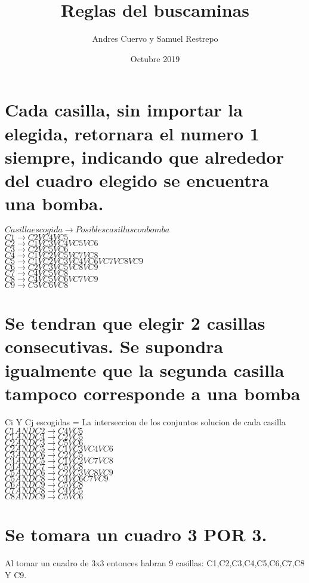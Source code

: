 \documentclass[10pt,letterpaper]{article}
\author{Andres Cuervo y Samuel Restrepo}
\title{Reglas del buscaminas}
\date{Octubre 2019}
\begin{document}
\maketitle

\section{Cada casilla, sin importar la elegida, retornara el numero 1 siempre, indicando que alrededor del cuadro elegido se encuentra una bomba.
}
$Casilla escogida \rightarrow   {Posibles casillas con bomba}$\\
$C1 \rightarrow{C2 V C4 V C5}$ \\
$C2 \rightarrow{C1 V C3 V C4 V C5 V C6}$\\
$C3 \rightarrow {C2 V C5 V C6}$\\
$C4 \rightarrow {C1 V C2 V C5 V C7 V C8}$\\
$C5 \rightarrow {C1 V C2 V C3 V C4 V C6 V C7 V C8 V C9}$\\
$C6 \rightarrow {C2 V C3 V C5 V C8 V C9}$ \\
$C7 \rightarrow {C4 V C5 V C8}$\\
$C8 \rightarrow {C4 V C5 V C6 V C7 V C9}$\\
$C9 \rightarrow {C5 V C6 V C8}$\\
\section{Se tendran que elegir 2 casillas consecutivas. Se supondra igualmente que la
segunda casilla tampoco corresponde a una bomba}
Ci Y Cj escogidas = La interseccion de los conjuntos solucion de cada casilla\\
$C1 AND C2 \rightarrow {C4 V C5}$\\
$C1 AND C4 \rightarrow {C2 V C5}$\\
$C2 AND C3 \rightarrow {C5 V C6}$\\
$C2 AND C5 \rightarrow {C1 V C3 V C4 V C6}$\\
$C3 AND C6 \rightarrow {C2 V C5}$\\
$C4 AND C5 \rightarrow {C1 V C2 V C7 V C8}$\\
$C4 AND C7 \rightarrow {C5 V C8}$\\
$C5 AND C6 \rightarrow {C2 V C3 V C8 V C9}$\\
$C5 AND C8 \rightarrow {C4 V C6 C7 V C9}$\\
$C6 AND C9 \rightarrow {C5 V C8}$\\
$C7 AND C8 \rightarrow {C4 V C5}$\\
$C8 AND C9 \rightarrow {C5 V C6}$\\
\section{Se tomara un cuadro 3 POR 3.}
Al tomar un cuadro de 3x3 entonces habran 9 casillas: C1,C2,C3,C4,C5,C6,C7,C8 Y C9.\\
\end{document}
